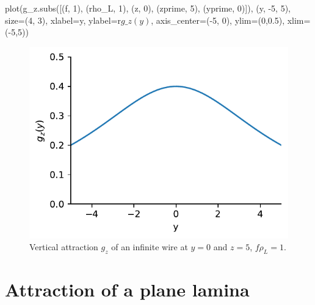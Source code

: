 \documentclass[
  a4paper,
  DIV=11,
  numbers=noendperiod]{scrreprt}
\newenvironment{Shaded}{\begin{snugshade}}{\end{snugshade}}
\newcommand{\DecValTok}[1]{\textcolor[rgb]{0.68,0.00,0.00}{#1}}
\newcommand{\FloatTok}[1]{\textcolor[rgb]{0.68,0.00,0.00}{#1}}
\newcommand{\NormalTok}[1]{\textcolor[rgb]{0.00,0.23,0.31}{#1}}
\newcommand{\OperatorTok}[1]{\textcolor[rgb]{0.37,0.37,0.37}{#1}}
\newcommand{\StringTok}[1]{\textcolor[rgb]{0.13,0.47,0.30}{#1}}
\newcommand{\VerbatimStringTok}[1]{\textcolor[rgb]{0.13,0.47,0.30}{#1}}
\begin{document}
\begin{Shaded}
\begin{Highlighting}[]
\NormalTok{plot(g\_z.subs([(f, }\DecValTok{1}\NormalTok{), (rho\_L, }\DecValTok{1}\NormalTok{), (z, }\DecValTok{0}\NormalTok{), (zprime, }\DecValTok{5}\NormalTok{), (yprime, }\DecValTok{0}\NormalTok{)]), }
\NormalTok{  (y, }\OperatorTok{{-}}\DecValTok{5}\NormalTok{, }\DecValTok{5}\NormalTok{), size}\OperatorTok{=}\NormalTok{(}\DecValTok{4}\NormalTok{, }\DecValTok{3}\NormalTok{),}
\NormalTok{  xlabel}\OperatorTok{=}\StringTok{\textquotesingle{}y\textquotesingle{}}\NormalTok{, ylabel}\OperatorTok{=}\VerbatimStringTok{r\textquotesingle{}$g\_z(y)$\textquotesingle{}}\NormalTok{, axis\_center}\OperatorTok{=}\NormalTok{(}\OperatorTok{{-}}\DecValTok{5}\NormalTok{, }\DecValTok{0}\NormalTok{), ylim}\OperatorTok{=}\NormalTok{(}\DecValTok{0}\NormalTok{,}\FloatTok{0.5}\NormalTok{), xlim}\OperatorTok{=}\NormalTok{(}\OperatorTok{{-}}\DecValTok{5}\NormalTok{,}\DecValTok{5}\NormalTok{))}
\end{Highlighting}
\end{Shaded}

\begin{figure}[H]

{\centering \includegraphics{line_of_mass_files/figure-pdf/cell-5-output-1.pdf}

}

\caption{Vertical attraction \(g_z\) of an infinite wire at \(y=0\) and
\(z=5\), \(f \rho_L = 1\).}

\end{figure}%

\section{Attraction of a plane
lamina}\label{attraction-of-a-plane-lamina}
\end{document}
